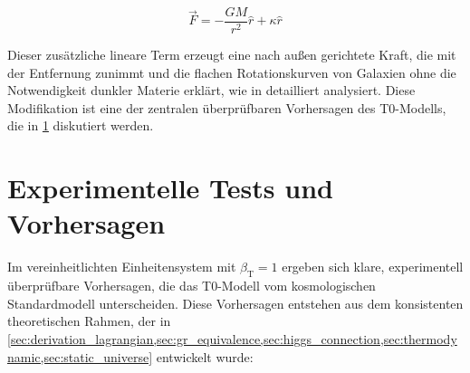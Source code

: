 \documentclass[12pt,a4paper]{article}
\newcommand{\betaT}{\beta_{\text{T}}}
\begin{document}
	\begin{equation}
		\label{eq:modified_force}
		\vec{F} = -\frac{GM}{r^2} \hat{r} + \kappa\hat{r}
	\end{equation}
	
	Dieser zusätzliche lineare Term erzeugt eine nach außen gerichtete Kraft, die mit der Entfernung zunimmt und die flachen Rotationskurven von Galaxien ohne die Notwendigkeit dunkler Materie erklärt, wie in \cite{pascher_galaxies_2025} detailliert analysiert. Diese Modifikation ist eine der zentralen überprüfbaren Vorhersagen des T0-Modells, die in \cref{sec:experiments} diskutiert werden.
	
	\section{Experimentelle Tests und Vorhersagen}
	\label{sec:experiments}
	Im vereinheitlichten Einheitensystem mit \(\betaT = 1\) ergeben sich klare, experimentell überprüfbare Vorhersagen, die das T0-Modell vom kosmologischen Standardmodell unterscheiden. Diese Vorhersagen entstehen aus dem konsistenten theoretischen Rahmen, der in \cref{sec:derivation_lagrangian,sec:gr_equivalence,sec:higgs_connection,sec:thermodynamic,sec:static_universe} entwickelt wurde:
	
\end{document}
